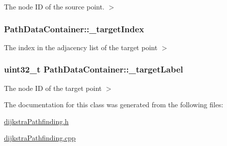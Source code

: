 The node I\-D of the source point. $>$ 

\hypertarget{classPathDataContainer_a276bb46806ebf42d7c0f620469f2f2da}{
\subsubsection[{\-\_\-target\-Index}]{ Path\-Data\-Container\-::\-\_\-target\-Index}}\label{classPathDataContainer_a276bb46806ebf42d7c0f620469f2f2da}


The index in the adjacency list of the target point $>$ 

\hypertarget{classPathDataContainer_ad0f623b05a5421f9a81dddc8375d5102}{
\subsubsection[{\-\_\-target\-Label}]{\setlength{\rightskip}{0pt plus 5cm}uint32\-\_\-t Path\-Data\-Container\-::\-\_\-target\-Label}}\label{classPathDataContainer_ad0f623b05a5421f9a81dddc8375d5102}


The node I\-D of the target point $>$ 



The documentation for this class was generated from the following files\-:\begin{DoxyCompactItemize}
\item 
\hyperlink{dijkstraPathfinding_8h}{dijkstra\-Pathfinding.\-h}\item 
\hyperlink{dijkstraPathfinding_8cpp}{dijkstra\-Pathfinding.\-cpp}\end{DoxyCompactItemize}
